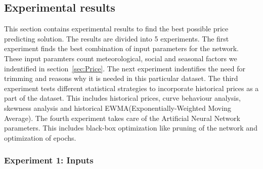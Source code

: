\subsection{Experimental results}
This section contains experimental results to find the best possible price predicting solution. The results are divided into 5 experiments. The first experiment finds the best combination of input parameters for the network. These input paramters count meteorological, social and seasonal factors we indentified in section~\ref{sec:Price}. The next experiment indentifies the need for trimming and reasons why it is needed in this particular dataset. The third experiment tests different statistical strategies to incorporate historical prices as a part of the dataset. This includes historical prices, curve behaviour analysis, skewness analysis and historical EWMA(Exponentially-Weighted Moving Average). The fourth experiment takes care of the Artificial Neural Network parameters. This includes black-box optimization like pruning of the network and optimization of epochs.

\subsubsection{Experiment 1: Inputs}

